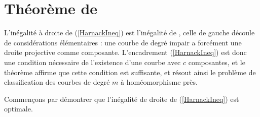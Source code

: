 \documentclass{livre}
\begin{document}
\section{Théorème de }


L'inégalité à droite de (\ref{HarnackIneq}) est l'inégalité de , celle de gauche découle de considérations élémentaires : une courbe de degré impair a forcément une droite projective comme composante. L'encadrement (\ref{HarnackIneq}) est donc une condition nécessaire de l'existence d'une courbe avec $c$ composantes, et le théorème affirme que cette condition est suffisante, et résout ainsi le problème de classification des courbes de degré $m$ à homéomorphisme près.

Commençons par démontrer que l'inégalité de droite de (\ref{HarnackIneq}) est optimale.
\end{document}
